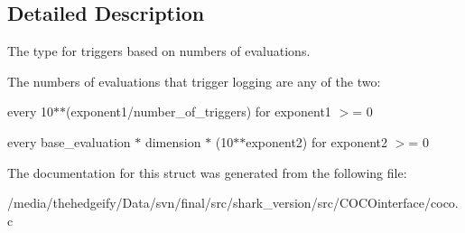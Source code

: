 \subsection{Detailed Description}
The type for triggers based on numbers of evaluations. 

The numbers of evaluations that trigger logging are any of the two\+:
\begin{DoxyItemize}
\item every 10$\ast$$\ast$(exponent1/number\+\_\+of\+\_\+triggers) for exponent1 $>$= 0
\item every base\+\_\+evaluation $\ast$ dimension $\ast$ (10$\ast$$\ast$exponent2) for exponent2 $>$= 0 
\end{DoxyItemize}

The documentation for this struct was generated from the following file\+:\begin{DoxyCompactItemize}
\item 
/media/thehedgeify/\+Data/svn/final/src/shark\+\_\+version/src/\+C\+O\+C\+Ointerface/coco.\+c\end{DoxyCompactItemize}
